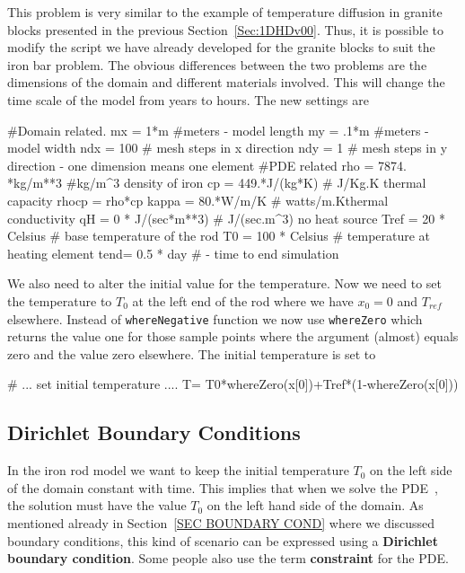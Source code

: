 This problem is very similar to the example of temperature diffusion in granite
blocks presented in the previous Section~\ref{Sec:1DHDv00}. Thus, it is possible
to modify the script we have already developed for the granite blocks to suit
the iron bar problem.  
The obvious differences between the two problems are the dimensions of the
domain and different materials involved. This will change the time scale of the
model from years to hours. The new settings are
\begin{python}
#Domain related.
mx = 1*m #meters - model length
my = .1*m #meters - model width
ndx = 100 # mesh steps in x direction 
ndy = 1 # mesh steps in y direction - one dimension means one element
#PDE related
rho = 7874. *kg/m**3 #kg/m^{3} density of iron
cp = 449.*J/(kg*K) # J/Kg.K thermal capacity
rhocp = rho*cp 
kappa = 80.*W/m/K   # watts/m.Kthermal conductivity
qH = 0 * J/(sec*m**3) # J/(sec.m^{3}) no heat source
Tref = 20 * Celsius  # base temperature of the rod
T0 = 100 * Celsius # temperature at heating element
tend= 0.5 * day # - time to end simulation
\end{python}
We also need to alter the initial value for the temperature. Now we need to set
the temperature to $T_{0}$ at the left end of the rod where we have
$x_{0}=0$ and 
$T_{ref}$ elsewhere. Instead of \verb|whereNegative| function we now
use \verb|whereZero| which returns the value one for those sample points where
the argument (almost) equals zero and the value zero elsewhere. The initial
temperature is set to
\begin{python}
# ... set initial temperature ....
T= T0*whereZero(x[0])+Tref*(1-whereZero(x[0]))
\end{python}

\subsection{Dirichlet Boundary Conditions}
In the iron rod model we want to keep the initial temperature $T_0$ on
the left side of the domain constant with time. 
This implies that when we solve the PDE~, the solution must
have the value $T_0$ on the left hand side of the domain. As mentioned
already in Section~\ref{SEC BOUNDARY COND} where we discussed boundary
conditions, this kind of scenario can be expressed using a
\textbf{Dirichlet boundary condition}. Some people also use the term
\textbf{constraint} for the PDE. 

